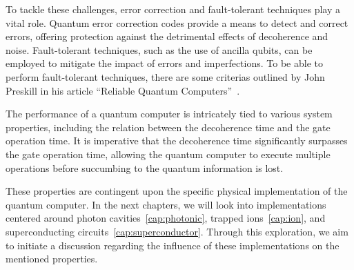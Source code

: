 \documentclass[
  journal=largetwo,
  year=2023,
]{cup-journal}
\begin{document}
To tackle these challenges, error correction and fault-tolerant techniques play a vital role. Quantum error correction codes provide a means to detect and correct errors, offering protection against the detrimental effects of decoherence and noise. Fault-tolerant techniques, such as the use of ancilla qubits, can be employed to mitigate the impact of errors and imperfections. To be able to perform fault-tolerant techniques, there are some criterias outlined by John Preskill in his article ``Reliable Quantum Computers''~\autocite{preskill_1998_reliable}.

The performance of a quantum computer is intricately tied to various system properties, including the relation between the decoherence time and the gate operation time. It is imperative that the decoherence time significantly surpasses the gate operation time, allowing the quantum computer to execute multiple operations before succumbing to the quantum information is lost.

These properties are contingent upon the specific physical implementation of the quantum computer. In the next chapters, we will look into implementations centered around photon cavities~\ref{cap:photonic}, trapped ions~\ref{cap:ion}, and superconducting circuits~\ref{cap:superconductor}. Through this exploration, we aim to initiate a discussion regarding the influence of these implementations on the mentioned properties.



\end{document}
